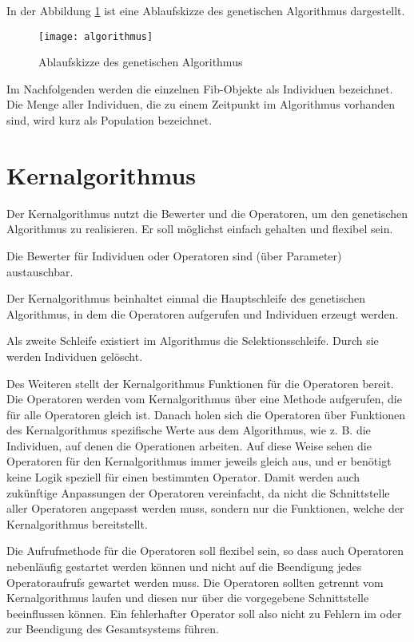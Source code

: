 In der Abbildung \ref{figGeneticAlgorithmus} ist eine Ablaufskizze des genetischen Algorithmus dargestellt.

\begin{figure}[htbp]
\begin{center}
  \texttt{[image: algorithmus]}
\end{center}
\caption{Ablaufskizze des genetischen Algorithmus}
\label{figGeneticAlgorithmus}
\end{figure}


Im Nachfolgenden werden die einzelnen Fib-Objekte als Individuen bezeichnet. Die Menge aller Individuen, die zu einem Zeitpunkt im Algorithmus vorhanden sind, wird kurz als Population bezeichnet.


\section{Kernalgorithmus}

Der Kernalgorithmus nutzt die Bewerter und die Operatoren, um den genetischen Algorithmus zu realisieren. Er soll möglichst einfach gehalten und flexibel sein.

Die Bewerter für Individuen oder Operatoren sind (über Parameter) austauschbar.

\bigskip
Der Kernalgorithmus beinhaltet einmal die Hauptschleife des genetischen Algorithmus, in dem die Operatoren aufgerufen und Individuen erzeugt werden.

Als zweite Schleife existiert im Algorithmus die Selektionsschleife. Durch sie werden Individuen gelöscht.

\bigskip
Des Weiteren stellt der Kernalgorithmus Funktionen für die Operatoren bereit. Die Operatoren werden vom Kernalgorithmus über eine Methode aufgerufen, die für alle Operatoren gleich ist. Danach holen sich die Operatoren über Funktionen des Kernalgorithmus spezifische Werte aus dem Algorithmus, wie z. B. die Individuen, auf denen die Operationen arbeiten. Auf diese Weise sehen die Operatoren für den Kernalgorithmus immer jeweils gleich aus, und er benötigt keine Logik speziell für einen bestimmten Operator. Damit werden auch zukünftige Anpassungen der Operatoren vereinfacht, da nicht die Schnittstelle aller Operatoren angepasst werden muss, sondern nur die Funktionen, welche der Kernalgorithmus bereitstellt.

Die Aufrufmethode für die Operatoren soll flexibel sein, so dass auch Operatoren nebenläufig gestartet werden können und nicht auf die Beendigung jedes Operatoraufrufs gewartet werden muss. Die Operatoren sollten getrennt vom Kernalgorithmus laufen und diesen nur über die vorgegebene Schnittstelle beeinflussen können. Ein fehlerhafter Operator soll also nicht zu Fehlern im oder zur Beendigung des Gesamtsystems führen.



